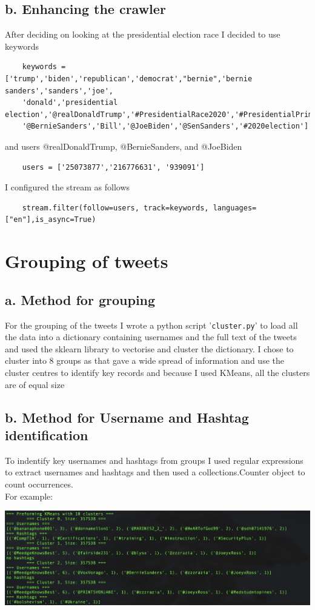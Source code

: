 \documentclass[10pt,a4paper]{article}
\begin{document}
	\subsection*{b. Enhancing the crawler} 
	After deciding on looking at the presidential election race I decided to use keywords
	\begin{verbatim}
	keywords = ['trump','biden','republican','democrat',"bernie",'bernie sanders','sanders','joe',
	'donald','presidential election','@realDonaldTrump','#PresidentialRace2020','#PresidentialPrimary',
	'@BernieSanders','Bill','@JoeBiden','@SenSanders','#2020election']
	\end{verbatim}
	and users  @realDonaldTrump, @BernieSanders, and @JoeBiden
	\begin{verbatim}
	users = ['25073877','216776631', '939091']
	\end{verbatim}
	I configured the stream as follows
	\begin{verbatim}
	stream.filter(follow=users, track=keywords, languages=["en"],is_async=True)
	\end{verbatim}
	
\section{Grouping of tweets}
	\subsection*{a. Method for grouping}
	For the grouping of the tweets I wrote a python script '\verb|cluster.py|' to load all the data into a dictionary containing usernames and the full text of the tweets and used the sklearn library to vectorise and cluster the dictionary.
	I chose to cluster into 8 groups as that gave a wide spread of information and use the cluster centres to identify key records and because I used KMeans, all the clusters are of equal size
	\subsection*{b. Method for Username and Hashtag identification}
	To indentify key usernames and hashtags from groups I used regular expressions to extract usernames and hashtags and then used a collections.Counter object to count occurrences. \\
	For example:
	
\includegraphics[width=\textwidth]{images/cluster_example.png} 
\end{document}
